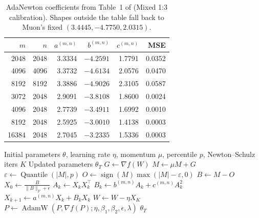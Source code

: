 \begin{table}[H]
\centering
\caption{AdaNewton coefficients from Table~1 of \citet{he_root_2025} (Mixed 1:3 calibration). Shapes outside the table fall back to Muon's fixed $(3.4445,-4.7750,2.0315)$.}
\label{tab:root-coefficients}
\small
\begin{tabular}{rrrrrr}
\toprule
$m$ & $n$ & $a^{(m,n)}$ & $b^{(m,n)}$ & $c^{(m,n)}$ & MSE \\
\midrule
2048 & 2048 & 3.3334 & $-4.2591$ & 1.7791 & 0.0352 \\
4096 & 4096 & 3.3732 & $-4.6134$ & 2.0576 & 0.0470 \\
8192 & 8192 & 3.3886 & $-4.9026$ & 2.3105 & 0.0587 \\
3072 & 2048 & 2.9091 & $-3.8108$ & 1.8600 & 0.0024 \\
4096 & 2048 & 2.7739 & $-3.4911$ & 1.6992 & 0.0010 \\
8192 & 2048 & 2.5925 & $-3.0010$ & 1.4138 & 0.0003 \\
16384 & 2048 & 2.7045 & $-3.2335$ & 1.5336 & 0.0003 \\
\bottomrule
\end{tabular}
\end{table}

\begin{algorithm}[H]
\caption{ROOT (Robust Orthogonalized Optimizer)}
\label{alg:root}
\begin{algorithmic}[1]
\Require Initial parameters $\theta$, learning rate $\eta$, momentum $\mu$, percentile $p$, Newton--Schulz iters $K$
\Ensure Updated parameters $\theta_T$
        \State $G \gets \nabla f(W)$ 
        \State $M \gets \mu M + G$ 
        \State $\varepsilon \gets \operatorname{Quantile}(|M|, p)$ 
        \State $O \gets \operatorname{sign}(M)\max(|M|-\varepsilon, 0)$ 
        \State $B \gets M - O$ 
        \State $X_0 \gets \frac{B}{\|B\|_F + \epsilon}$ 
            \State $A_k \gets X_k X_k^\top$ 
            \State $B_k \gets b^{(m,n)} A_k + c^{(m,n)} A_k^2$ 
            \State $X_{k+1} \gets a^{(m,n)} X_k + B_k X_k$ 
        \EndFor
        \State $W \gets W - \eta X_K$ 
    \Else
        \State $P \gets \operatorname{AdamW}(P, \nabla f(P); \eta, \beta_1, \beta_2, \epsilon, \lambda)$ 
    \EndIf
\EndFor
\Return $\theta_T$
\end{algorithmic}
\end{algorithm}

